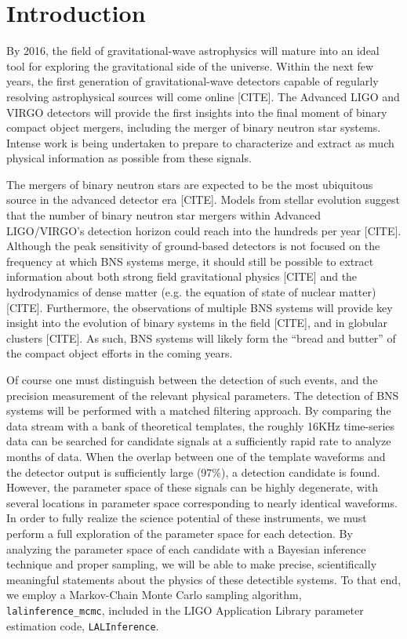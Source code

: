 \documentclass[11pt,a4paper]{emulateapj}
\newcommand{\carl}[1]{{\color{red}  #1}}
\begin{document}
\section{Introduction}

 By 2016, the field of gravitational-wave astrophysics will
 mature into an ideal tool for 
 exploring the gravitational side of the universe. Within the next few
 years, the first generation of gravitational-wave detectors capable 
 of regularly resolving astrophysical sources will come online \carl{[CITE]}.
 The Advanced LIGO and VIRGO detectors will provide the first insights
 into the final moment of binary compact object mergers, including the 
 merger of binary neutron star systems.  Intense work is being undertaken
 to prepare to characterize and extract as much physical 
 information as possible from these signals.
 
The mergers of binary neutron stars are expected to be the most ubiquitous
source in the advanced detector era \carl{[CITE]}.   Models from stellar 
evolution suggest that the number of binary neutron star mergers within 
Advanced LIGO/VIRGO's detection horizon could reach into the hundreds per 
year \carl{[CITE]}.  Although the peak sensitivity of ground-based detectors
is not focused on the frequency at which BNS systems merge, it should still
be possible to extract information about both strong field gravitational 
physics \carl{[CITE]} and the hydrodynamics of dense matter (e.g. the equation 
of state of nuclear matter) \carl{[CITE]}.  Furthermore, the observations of multiple BNS
systems will provide key insight into the evolution of binary systems in the field \carl{[CITE]},
and in globular clusters \carl{[CITE]}. As such, BNS systems will likely 
form the ``bread and butter'' of the compact object efforts in the coming 
years.


Of course one must distinguish between the detection of 
such events, and the precision measurement of the relevant physical parameters.
The detection of BNS systems will be performed with a matched filtering approach.  
By comparing the data stream with a bank of theoretical templates, the roughly 16KHz
 time-series data can be searched for candidate signals at a sufficiently
  rapid rate to analyze months of data.  When the overlap between one of the template waveforms and the 
detector output is sufficiently large (97\%), a detection candidate is found.  However,
the parameter space of these signals can be highly degenerate, with several 
locations in parameter space corresponding to nearly identical waveforms.  In 
order to fully realize the science potential of these instruments, we must 
perform a full exploration of the parameter space for each detection.  By 
analyzing the parameter space of each candidate with a Bayesian inference technique 
and proper sampling, we will be able to make precise, scientifically meaningful
statements about the physics of these detectible systems.  To 
that end, we employ a Markov-Chain Monte Carlo sampling algorithm, 
\texttt{lalinference\_mcmc}, included in the LIGO Application Library parameter
estimation code, \texttt{LALInference}.  
\end{document}
